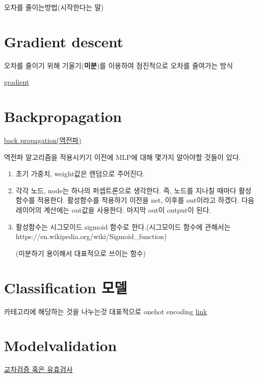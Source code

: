 \documentclass[11pt]{article}
\begin{document}
    오차를 줄이는방법(시작한다는 말)

    \section{Gradient descent}\label{gradient-descent}

    오차를 줄이기 위해 기울기(\textbf{미분})를 이용하여 점진적으로 오차를
줄여가는 방식

    \href{http://aikorea.org/cs231n/optimization-1}{gradient}

    \section{Backpropagation}\label{backpropagation}

    \href{http://llnntms.tistory.com/31}{back propagation(역전파)}

    역전파 알고리즘을 적용시키기 이전에 MLP에 대해 몇가지 알아야할 것들이
있다.

\begin{enumerate}
\def\labelenumi{\alph{enumi}.}
\item
  초기 가중치, weight값은 랜덤으로 주어진다.
\item
  각각 노드, node는 하나의 퍼셉트론으로 생각한다. 즉, 노드를 지나칠
  때마다 활성함수를 적용한다. 활성함수를 적용하기 이전을 net, 이후를
  out이라고 하겠다. 다음 레이어의 계산에는 out값을 사용한다. 마지막
  out이 output이 된다.
\item
  활성함수는 시그모이드 sigmoid 함수로 한다.(시그모이드 함수에 관해서는
  https://en.wikipedia.org/wiki/Sigmoid\_function)

  (미분하기 용이해서 대표적으로 쓰이는 함수)
\end{enumerate}

    \section{Classification 모델}\label{classification-uxbaa8uxb378}

    카테고리에 해당하는 것을 나누는것 대표적으로 onehot encoding
\href{http://www.openwith.net/?p=617}{link}

    \section{Modelvalidation}\label{modelvalidation}

    \href{http://daryan.tistory.com/21}{교차검증 혹은 유효검사}
\end{document}
